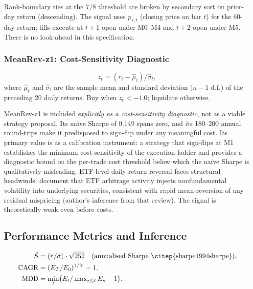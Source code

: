 \documentclass[12pt]{article}
\begin{document}
Rank-boundary ties at the 7/8 threshold are broken by secondary sort
on prior-day return (descending). The signal uses $p_{s,t}$ (closing
price on bar $t$) for the 60-day return; fills execute at $t+1$ open
under M0--M4 and $t+2$ open under M5. There is no look-ahead in this
specification.

\subsubsection{MeanRev-z1: Cost-Sensitivity Diagnostic}

\begin{equation}
  z_t = (r_t - \hat\mu_t)/\hat\sigma_t,
  \label{eq:meanrev}
\end{equation}
where $\hat\mu_t$ and $\hat\sigma_t$ are the sample mean and standard
deviation ($n-1$ d.f.) of the preceding 20 daily returns. Buy when
$z_t < -1.0$; liquidate otherwise.

MeanRev-z1 is included \emph{explicitly as a cost-sensitivity
diagnostic}, not as a viable strategy proposal. Its na\"{i}ve Sharpe
of 0.149 spans zero, and its 180--200 annual round-trips make it
predisposed to sign-flip under any meaningful cost. Its primary value
is as a calibration instrument: a strategy that sign-flips at M1
establishes the minimum cost sensitivity of the execution ladder and
provides a diagnostic bound on the per-trade cost threshold below which
the na\"{i}ve Sharpe is qualitatively misleading. ETF-level
daily return reversal faces structural headwinds: \citet{ben2012exchange}
document that ETF arbitrage activity injects nonfundamental volatility
into underlying securities, consistent with rapid mean-reversion of
any residual mispricing (author's inference from that review). The signal is
theoretically weak even before costs.

\subsection{Performance Metrics and Inference}
\label{sec:inference}

\begin{align}
  \hat{S} &= (\bar{r}/\hat\sigma) \cdot \sqrt{252}
    \quad\text{(annualised Sharpe \citep{sharpe1994sharpe}),}
    \label{eq:sharpe}\\
  \mathrm{CAGR} &= (E_T/E_0)^{1/Y} - 1,
    \label{eq:cagr}\\
  \mathrm{MDD} &= \min_t\bigl(E_t/\textstyle\max_{s \le t} E_s - 1\bigr).
    \label{eq:mdd}
\end{align}
\end{document}
